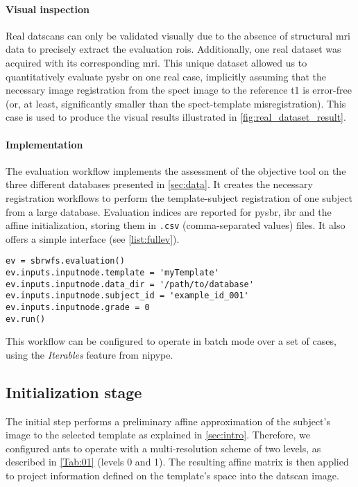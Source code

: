 \documentclass{frontiers}
\begin{document}
\paragraph{Visual inspection} %
Real \glspl*{datscan} can only be validated visually due to the 
  absence of structural \gls*{mri} data to precisely extract
  the evaluation \glspl*{roi}.
Additionally, one real dataset was acquired with its corresponding \gls*{mri}.
This unique dataset allowed us to quantitatively evaluate \gls*{pysbr} on one real case,
  implicitly assuming that the necessary image registration from the 
  \gls*{spect} image to the reference \gls*{t1} is error-free 
  (or, at least, significantly smaller than the \gls*{spect}-template misregistration).
This case is used to produce the visual results illustrated in
  \autoref{fig:real_dataset_result}.

\paragraph{Implementation} %
The evaluation workflow implements the assessment of the objective tool on the three different
  databases presented in \autoref{sec:data}. 
It creates the necessary registration workflows to perform the template-subject 
  registration of one subject from a large database.
Evaluation indices are reported for \gls*{pysbr}, \gls*{ibr} and the affine initialization,
  storing them in \texttt{.csv} (comma-separated values) files. 
It also offers a simple interface (see \autoref{list:fullev}).
\begin{lstlisting}[float,caption={\label{list:fullev}Running the evaluation pipeline}]
ev = sbrwfs.evaluation()
ev.inputs.inputnode.template = 'myTemplate'
ev.inputs.inputnode.data_dir = '/path/to/database'
ev.inputs.inputnode.subject_id = 'example_id_001'
ev.inputs.inputnode.grade = 0
ev.run()
\end{lstlisting}
\noindent 
This workflow can be configured to operate in batch mode over a
  set of cases, using the \emph{Iterables} feature from \gls*{nipype}.

\subsection{Initialization stage}
\label{sec:meth_initialization}
The initial step performs a preliminary affine approximation of the subject's
  image to the selected template as explained in \autoref{sec:intro}.
Therefore, we configured \gls*{ants} to operate with a multi-resolution scheme
  of two levels, as described in \autoref{Tab:01} (levels 0 and 1).
The resulting affine matrix is then applied to project information defined on
  the template's space into the \gls*{datscan} image.
\end{document}

